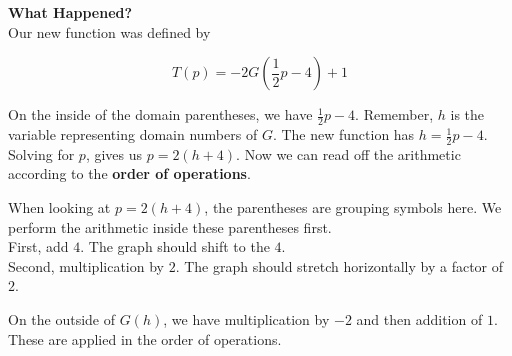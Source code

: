 \documentclass{ximera}
\begin{document}
\begin{example}
\begin{image}
\end{image}






\textbf{What Happened?} \\

Our new function was defined by 

\[
T(p) = -2G\left( \frac{1}{2} p - 4 \right) + 1
\]






On the inside of the domain parentheses, we have $\frac{1}{2} p - 4$.  Remember, $h$ is the variable representing domain numbers of $G$. The new function has $h = \frac{1}{2} p - 4$. Solving for $p$, gives us $p = 2(h+4)$.  Now we can read off the arithmetic according to the \textbf{order of operations}.  




When looking at $p = 2(h+4)$, the parentheses are grouping symbols here.  We perform the arithmetic inside these parentheses first. \\

First, add $4$. The graph should shift to the  $4$. \\
Second, multiplication by $2$. The graph should stretch horizontally by a factor of $2$.




On the outside of $G(h)$, we have multiplication by $-2$ and then addition of $1$.  These are applied in the order of operations. \\


\end{example}
\end{document}
